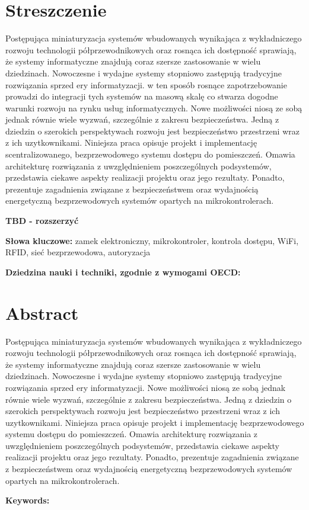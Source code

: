 \section*{Streszczenie}
	Postępująca miniaturyzacja systemów wbudowanych wynikająca z wykładniczego rozwoju technologii półprzewodnikowych oraz rosnąca ich dostępność sprawiają, że systemy informatyczne znajdują coraz szersze zastosowanie w wielu dziedzinach. Nowoczesne i wydajne systemy stopniowo zastępują tradycyjne rozwiązania sprzed ery informatyzacji. w ten sposób rosnące zapotrzebowanie prowadzi do integracji tych systemów na masową skalę co stwarza dogodne warunki rozwoju na rynku usług informatycznych. Nowe możliwości niosą ze sobą jednak równie wiele wyzwań, szczególnie z zakresu bezpieczeństwa. Jedną z dziedzin o szerokich perspektywach rozwoju jest bezpieczeństwo przestrzeni wraz z ich uzytkownikami. Niniejsza praca opisuje projekt i implementację scentralizowanego, bezprzewodowego systemu dostępu do pomieszczeń. Omawia architekturę rozwiązania z uwzględnieniem poszczególnych podsystemów, przedstawia ciekawe aspekty realizacji projektu oraz jego rezultaty. Ponadto, prezentuje zagadnienia związane z bezpieczeństwem oraz wydajnością energetyczną bezprzewodowych systemów opartych na mikrokontrolerach.

	\textbf{TBD - rozszerzyć}

	\textbf{Słowa kluczowe:} zamek elektroniczny, mikrokontroler, kontrola dostępu, WiFi, RFID, sieć bezprzewodowa, autoryzacja

	\textbf{Dziedzina nauki i techniki, zgodnie z wymogami OECD:}

\section*{Abstract}
	Postępująca miniaturyzacja systemów wbudowanych wynikająca z wykładniczego rozwoju technologii półprzewodnikowych oraz rosnąca ich dostępność sprawiają, że systemy informatyczne znajdują coraz szersze zastosowanie w wielu dziedzinach. Nowoczesne i wydajne systemy stopniowo zastępują tradycyjne rozwiązania sprzed ery informatyzacji. Nowe możliwości niosą ze sobą jednak równie wiele wyzwań, szczególnie z zakresu bezpieczeństwa. Jedną z dziedzin o szerokich perspektywach rozwoju jest bezpieczeństwo przestrzeni wraz z ich uzytkownikami. Niniejsza praca opisuje projekt i implementację bezprzewodowego systemu dostępu do pomieszczeń. Omawia architekturę rozwiązania z uwzględnieniem poszczególnych podsystemów, przedstawia ciekawe aspekty realizacji projektu oraz jego rezultaty. Ponadto, prezentuje zagadnienia związane z bezpieczeństwem oraz wydajnością energetyczną bezprzewodowych systemów opartych na mikrokontrolerach.

	\textbf{Keywords:}